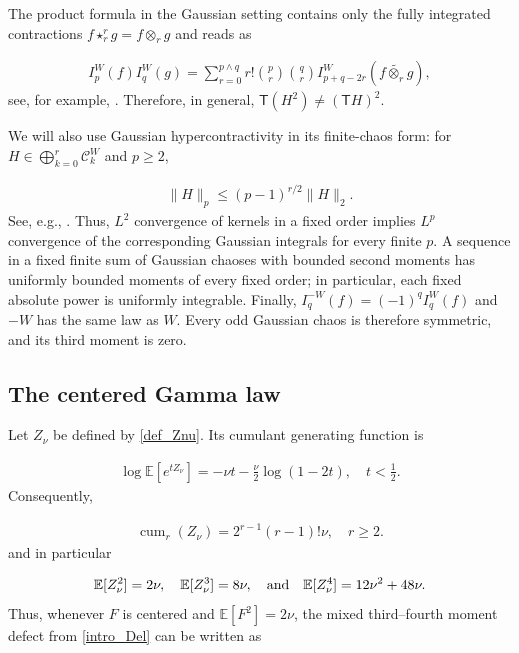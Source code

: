 \documentclass[letterpaper,11pt,reqno]{amsart}
\numberwithin{equation}{section}
\theoremstyle{plain}
\theoremstyle{definition}
\theoremstyle{remark}
\newcommand{\E}{\mathbb{E}}
\newcommand{\cC}{\mathcal{C}}
\DeclareMathOperator{\cum}{cum}
\newcommand{\noi}{\noindent}
\newcommand{\wt}{\widetilde}
\newcommand{\AND}{\quad{\rm and}\quad}
\begin{document}
The product formula in the Gaussian setting
contains only the fully
integrated contractions $f\star_r^r g = f\otimes_r g$
and reads as

\noi
\begin{align}
 I_p^W(f)I_q^W(g)
 =\sum_{r=0}^{p\wedge q}
 r!\binom pr\binom qr
 I_{p+q-2r}^W
 \left( f\wt{\otimes_r} g\right),
 \label{Gau_prod_full}
\end{align}
see, for example, \cite[Theorem~2.7.10]{NP12}.  Therefore, in general,
 $\mathsf T(H^2)\neq(\mathsf T H)^2$.

We will also use Gaussian hypercontractivity in its finite-chaos
form: for $H\in\bigoplus_{k=0}^r\cC_k^W$ and $p\geq2$,


\noi
\begin{align}
 \|H\|_p\leq(p-1)^{r/2}\|H\|_2.
 \label{Gau_hyper}
\end{align}
See, e.g., \cite[Proposition~2.6]{NPR10}.
Thus, $L^2$ convergence of
kernels in a fixed order implies $L^p$ convergence of the
corresponding Gaussian integrals for every finite $p$.
A sequence in a fixed finite sum of Gaussian chaoses with bounded
second moments has uniformly bounded moments of every fixed
order; in particular, each fixed absolute power is uniformly
integrable.  Finally,
$I_q^{-W}(f)=(-1)^qI_q^W(f)$ and $-W$ has the same law as $W$.
Every odd Gaussian chaos is therefore symmetric, and its third
moment is zero.


\subsection{The centered Gamma law}
\label{SEC_22}

Let $Z_\nu$ be defined by \eqref{def_Znu}.
Its cumulant generating
function is


\noi
\begin{align}
 \log\E[e^{tZ_\nu}]
 =-\nu t-\frac\nu2\log(1-2t),
 \quad t<\frac12.
 \label{Gamma_cgf}
\end{align}
Consequently,


\noi
\begin{align*}
 \cum_r(Z_\nu)
 =2^{r-1}(r-1)!\nu,
 \quad r\geq2.
\end{align*}
and in particular


\noi
\begin{align}
 \E[Z_\nu^2]=2\nu,
 \quad
 \E[Z_\nu^3]=8\nu,
 \AND
 \E[Z_\nu^4]=12\nu^2+48\nu.
 \label{Gamma_moments}
\end{align}
Thus, whenever $F$ is centered and $\E[F^2]=2\nu$, the mixed
third--fourth moment defect from \eqref{intro_Del} can be written as
\end{document}
